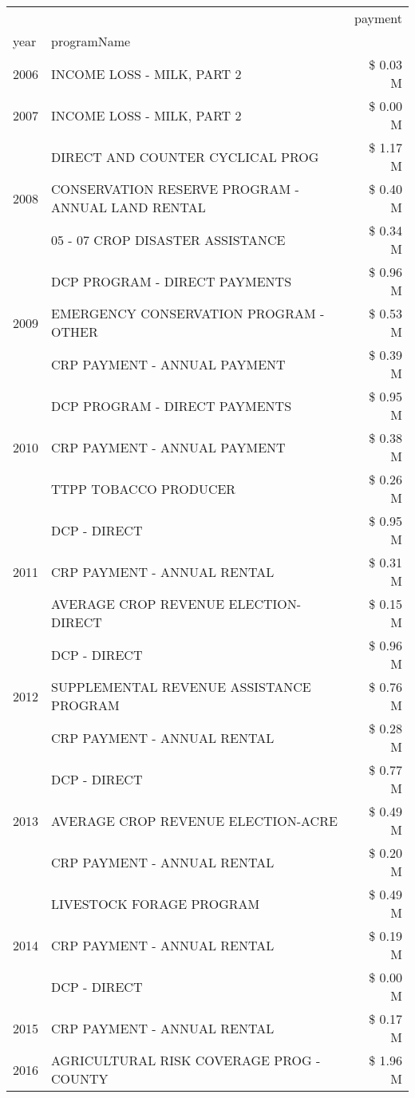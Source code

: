 \begin{tabular}{llr}
\toprule
 &  & payment \\
year & programName &  \\
\midrule
2006 & INCOME LOSS - MILK, PART 2 & \$ 0.03 M \\
\cline{1-3}
2007 & INCOME LOSS - MILK, PART 2 & \$ 0.00 M \\
\cline{1-3}
\multirow[t]{3}{*}{2008} & DIRECT AND COUNTER CYCLICAL PROG & \$ 1.17 M \\
 & CONSERVATION RESERVE PROGRAM - ANNUAL LAND RENTAL & \$ 0.40 M \\
 & 05 - 07 CROP DISASTER ASSISTANCE & \$ 0.34 M \\
\cline{1-3}
\multirow[t]{3}{*}{2009} & DCP PROGRAM - DIRECT PAYMENTS & \$ 0.96 M \\
 & EMERGENCY CONSERVATION PROGRAM - OTHER & \$ 0.53 M \\
 & CRP PAYMENT - ANNUAL PAYMENT & \$ 0.39 M \\
\cline{1-3}
\multirow[t]{3}{*}{2010} & DCP PROGRAM - DIRECT PAYMENTS & \$ 0.95 M \\
 & CRP PAYMENT - ANNUAL PAYMENT & \$ 0.38 M \\
 & TTPP TOBACCO PRODUCER & \$ 0.26 M \\
\cline{1-3}
\multirow[t]{3}{*}{2011} & DCP - DIRECT & \$ 0.95 M \\
 & CRP PAYMENT - ANNUAL RENTAL & \$ 0.31 M \\
 & AVERAGE CROP REVENUE ELECTION-DIRECT & \$ 0.15 M \\
\cline{1-3}
\multirow[t]{3}{*}{2012} & DCP - DIRECT & \$ 0.96 M \\
 & SUPPLEMENTAL REVENUE ASSISTANCE PROGRAM & \$ 0.76 M \\
 & CRP PAYMENT - ANNUAL RENTAL & \$ 0.28 M \\
\cline{1-3}
\multirow[t]{3}{*}{2013} & DCP - DIRECT & \$ 0.77 M \\
 & AVERAGE CROP REVENUE ELECTION-ACRE & \$ 0.49 M \\
 & CRP PAYMENT - ANNUAL RENTAL & \$ 0.20 M \\
\cline{1-3}
\multirow[t]{3}{*}{2014} & LIVESTOCK FORAGE PROGRAM & \$ 0.49 M \\
 & CRP PAYMENT - ANNUAL RENTAL & \$ 0.19 M \\
 & DCP - DIRECT & \$ 0.00 M \\
\cline{1-3}
2015 & CRP PAYMENT - ANNUAL RENTAL & \$ 0.17 M \\
\cline{1-3}
\multirow[t]{3}{*}{2016} & AGRICULTURAL RISK COVERAGE PROG - COUNTY & \$ 1.96 M \\

\end{tabular}
